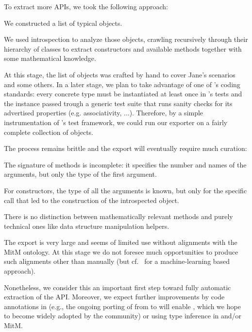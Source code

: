 To extract more APIs, we took the following approach:
\begin{compactenum}
\item We constructed a list of typical \Sage objects.
\item We used introspection to analyze those objects, crawling recursively through their hierarchy of classes to extract constructors and available methods together with some mathematical knowledge.
\end{compactenum}

At this stage, the list of objects was crafted by hand to cover Jane's scenarios and some others.
In a later stage, we plan to take advantage of one of \Sage's coding standards: every concrete type must be instantiated at least once in \Sage's tests and the instance passed
trough a generic test suite that runs sanity checks for its advertised
properties (e.g. associativity, ...).
Therefore, by a simple instrumentation of \Sage's test framework, we could run our exporter on a fairly complete collection of \Sage objects.

The process remains brittle and the export will eventually require much curation:
\begin{compactitem}
\item The signature of methods is incomplete: it specifies the number and names of the arguments, but only the type of the first argument.
\item For constructors, the type of all the arguments is known, but only for the specific call that led to the construction of the introspected object.
\item There is no distinction between mathematically relevant methods and purely technical ones like data structure manipulation helpers.
\item The export is very large and seems of limited use without alignments with the MitM ontology. At this stage we do not foresee much opportunities to produce such alignments other than manually (but cf.~\cite{MueGauKal:cacfms17} for a machine-learning based approach).
\end{compactitem}

Nonetheless, we consider this an important first step toward fully automatic extraction of the \Sage API.
Moreover, we expect further improvements by code annotations in \Sage
(e.g., the ongoing porting of \Sage from  to  will enable , which we hope to become widely
adopted by the community) or using type inference in \Sage and/or MitM.

